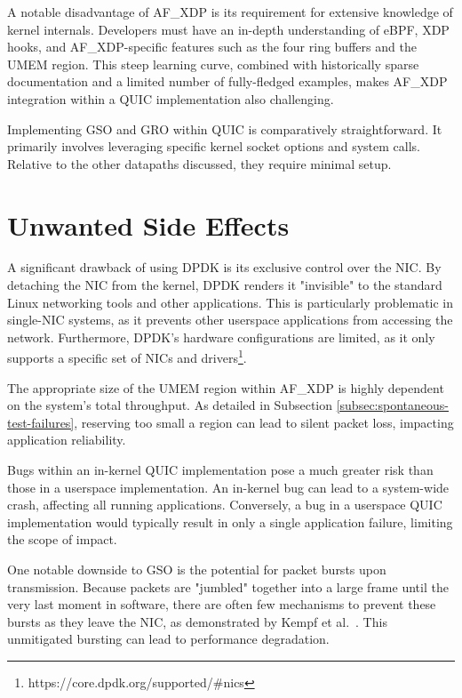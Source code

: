 A notable disadvantage of AF\_XDP is its requirement for extensive knowledge of kernel internals. Developers must have an in-depth understanding of \ac{eBPF}, \ac{XDP} hooks, and AF\_XDP-specific features such as the four ring buffers and the UMEM region. This steep learning curve, combined with historically sparse documentation and a limited number of fully-fledged examples, makes AF\_XDP integration within a QUIC implementation also challenging.

Implementing \ac{GSO} and \ac{GRO} within QUIC is comparatively straightforward. It primarily involves leveraging specific kernel socket options and system calls. Relative to the other datapaths discussed, they require minimal setup.

\section{Unwanted Side Effects}
\label{subsec:unwanted-side-effects}

A significant drawback of using \ac{DPDK} is its exclusive control over the \ac{NIC}. By detaching the \ac{NIC} from the kernel, \ac{DPDK} renders it "invisible" to the standard Linux networking tools and other applications. This is particularly problematic in single-\ac{NIC} systems, as it prevents other userspace applications from accessing the network. Furthermore, \ac{DPDK}'s hardware configurations are limited, as it only supports a specific set of \ac{NIC}s and drivers\footnote{https://core.dpdk.org/supported/\#nics}.

The appropriate size of the UMEM region within AF\_XDP is highly dependent on the system's total throughput. As detailed in Subsection \ref{subsec:spontaneous-test-failures}, reserving too small a region can lead to silent packet loss, impacting application reliability.

Bugs within an in-kernel QUIC implementation pose a much greater risk than those in a userspace implementation. An in-kernel bug can lead to a system-wide crash, affecting all running applications. Conversely, a bug in a userspace QUIC implementation would typically result in only a single application failure, limiting the scope of impact.

One notable downside to \ac{GSO} is the potential for packet bursts upon transmission. Because packets are "jumbled" together into a large frame until the very last moment in software, there are often few mechanisms to prevent these bursts as they leave the \ac{NIC}, as demonstrated by Kempf et al.~\cite{Kempf_2025}. This unmitigated bursting can lead to performance degradation.

